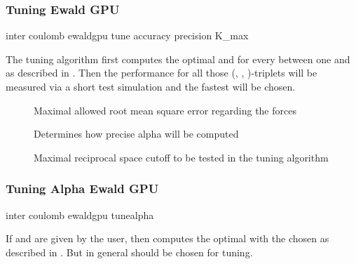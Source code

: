 \subsubsection{Tuning Ewald GPU}
\label{ssec:tuneewaldgpu}
\begin{essyntax}
  inter coulomb  ewaldgpu tune
  accuracy  precision 
  K_max 
  \begin{features}
  \end{features}
\end{essyntax}

The tuning algorithm first computes the optimal  and  for every  between one and  as described in \cite{kolafa92}. Then the performance for all those (, , )-triplets will be measured via a short test simulation and the fastest will be chosen. 

\begin{description}
\item[] Maximal allowed root mean square error regarding the forces
\item[] Determines how precise alpha will be computed
\item[] Maximal reciprocal space cutoff  to be tested in the tuning algorithm
\end{description}

\subsubsection{Tuning Alpha Ewald GPU}
\label{ssec:tunealphaewaldgpu}
\begin{essyntax}
  inter coulomb  ewaldgpu tunealpha
    
  \begin{features}
  \end{features}
\end{essyntax}

If  and  are given by the user, then  computes the optimal  with the chosen  as described in \cite{kolafa92}. But in general  should be chosen for tuning. 


